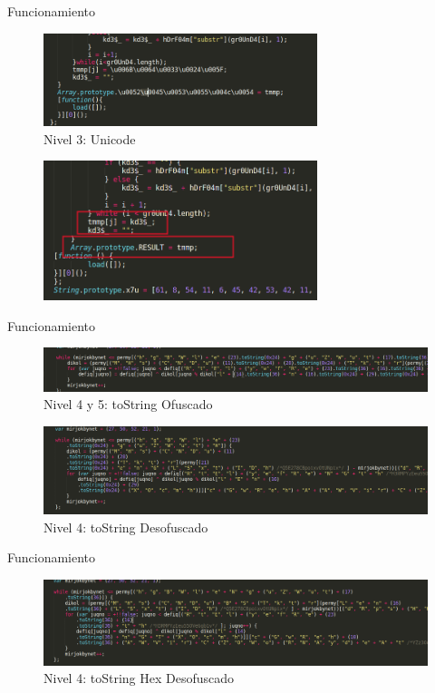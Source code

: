 \documentclass[aspectratio=169]{beamer}
\begin{document}
  	\begin{frame}{Funcionamiento}
		\begin{figure}[H]
			\centering
			\includegraphics[width=8cm]{images/level3.png}
			\caption{Nivel 3: Unicode} 
		\end{figure}
		
		\begin{figure}[H]
			\centering
			\includegraphics[width=8cm]{images/level3_after.png}
		\end{figure}
  	\end{frame}
  	\begin{frame}{Funcionamiento}
		\begin{figure}[H]
			\centering
			\includegraphics[width=15cm]{images/level4.png}
			\caption{Nivel 4 y 5: toString Ofuscado} 
		\end{figure}
		
		\begin{figure}[H]
			\centering
			\includegraphics[width=15cm]{images/level4_after.png}
			\caption{Nivel 4: toString Desofuscado} 
		\end{figure}
  	\end{frame}
  	\begin{frame}{Funcionamiento}
		\begin{figure}[H]
			\centering
			\includegraphics[width=15cm]{images/level5_after.png}
			\caption{Nivel 4: toString Hex Desofuscado} 
		\end{figure}
  	\end{frame}
  	
\end{document}
